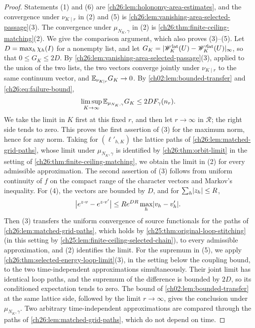 \begin{proof}
Statements (1) and (6) are \cref{ch26:lem:holonomy-area-estimates}, and the convergence under $\nu_{K\mid r}$ in (2) and (5) is \cref{ch26:lem:vanishing-area-selected-passage}(3). The convergence under $\mu_{N_K,\gamma}$ in (2) is \cref{ch26:thm:finite-ceiling-matching}(2). We give the comparison argument, which also proves (3)--(5). Let $D=\max_h\chi_h(I)$ for a nonempty list, and let $G_K=\lvert \mathscr W^{\mathrm{lat}}_K(U)-\mathscr W'^{\mathrm{lat}}_K(U)\rvert_\infty$, so that $0\le G_K\le2D$. By \cref{ch26:lem:vanishing-area-selected-passage}(3), applied to the union of the two lists, the two vectors converge jointly under $\nu_{K\mid r}$ to the same continuum vector, and $\mathbb E_{\nu_{K\mid r}}G_K\to0$. By \cref{ch02:lem:bounded-transfer} and \eqref{ch26:eq:failure-bound},
\[
 \limsup_{K\to\infty}\mathbb E_{\mu_{N_K,\gamma}}G_K\le2DF_\gamma(n_r).
\]
We take the limit in $K$ first at this fixed $r$, and then let $r\to\infty$ in $\mathcal R$; the right side tends to zero. This proves the first assertion of (3) for the maximum norm, hence for any norm. Taking for $(\ell'_{h,K})$ the lattice paths of \cref{ch26:lem:matched-grid-paths}, whose limit under $\mu_{N_K,\gamma}$ is identified by \cref{ch26:thm:orbit-limit} in the setting of \cref{ch26:thm:finite-ceiling-matching}, we obtain the limit in (2) for every admissible approximation. The second assertion of (3) follows from uniform continuity of $f$ on the compact range of the character vectors and Markov's inequality. For (4), the vectors are bounded by $D$, and for $\sum_h\lvert z_h\rvert\le R$,
\[
 \bigl\lvert e^{z\cdot v}-e^{z\cdot v'}\bigr\rvert\le Re^{DR}\max_h\lvert v_h-v'_h\rvert.
\]
Then (3) transfers the uniform convergence of source functionals for the paths of \cref{ch26:lem:matched-grid-paths}, which holds by \cref{ch25:thm:original-loop-stitching} (in this setting by \cref{ch25:lem:finite-ceiling-selected-chain}), to every admissible approximation, and (2) identifies the limit. For the supremum in (5), we apply \cref{ch26:thm:selected-energy-loop-limit}(3), in the setting below the coupling bound, to the two time-independent approximations simultaneously. Their joint limit has identical loop paths, and the supremum of the difference is bounded by $2D$, so its conditioned expectation tends to zero. The bound of \cref{ch02:lem:bounded-transfer} at the same lattice side, followed by the limit $r\to\infty$, gives the conclusion under $\mu_{N_K,\gamma}$. Two arbitrary time-independent approximations are compared through the paths of \cref{ch26:lem:matched-grid-paths}, which do not depend on time.
\end{proof}

